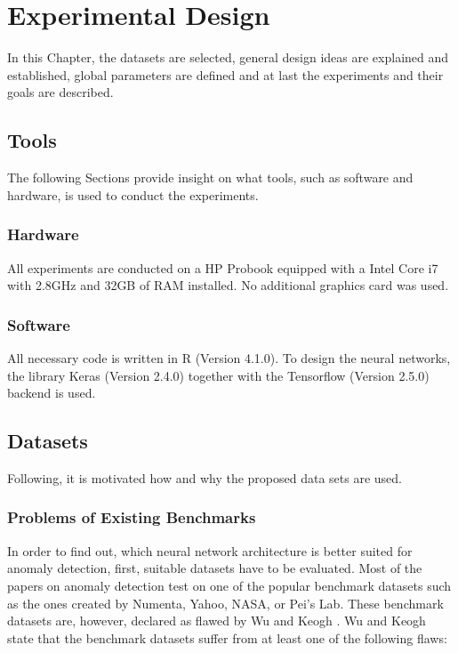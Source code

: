 \chapter{Experimental Design}
In this Chapter, the datasets are selected, general design ideas are explained and established, global parameters are defined and at last the experiments and their goals are described.

\section{Tools}
The following Sections provide insight on what tools, such as software and hardware, is used to conduct the experiments.

\subsection{Hardware}
All experiments are conducted on a HP Probook equipped with a Intel Core i7 with 2.8GHz and 32GB of RAM installed. No additional graphics card was used.

\subsection{Software}
All necessary code is written in R (Version 4.1.0). To design the neural networks, the library Keras (Version 2.4.0) together with the Tensorflow (Version 2.5.0) backend is used.


\section{Datasets}
Following, it is motivated how and why the proposed data sets are used.

\subsection{Problems of Existing Benchmarks} \label{Problems of Existing Benchmarks}
In order to find out, which neural network architecture is better suited for anomaly detection, first, suitable datasets have to be evaluated. Most of the papers on anomaly detection test on one of the popular benchmark datasets such as the ones created by Numenta, Yahoo, NASA, or Pei's Lab. These benchmark datasets are, however, declared as flawed by Wu and Keogh \parencite*{Wu2020}. Wu and Keogh state that the benchmark datasets suffer from at least one of the following flaws:

